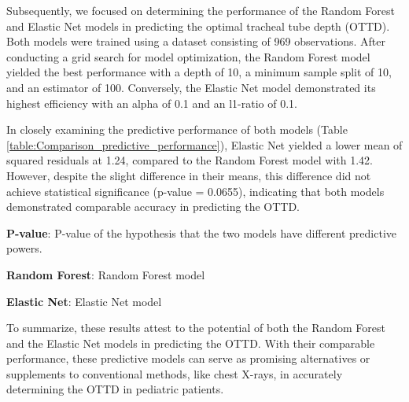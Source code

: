\documentclass[11pt]{article}
\begin{document}
Subsequently, we focused on determining the performance of the Random Forest and Elastic Net models in predicting the optimal tracheal tube depth (OTTD). Both models were trained using a dataset consisting of 969 observations. After conducting a grid search for model optimization, the Random Forest model yielded the best performance with a depth of 10, a minimum sample split of 10, and an estimator of 100. Conversely, the Elastic Net model demonstrated its highest efficiency with an alpha of 0.1 and an l1-ratio of 0.1.

In closely examining the predictive performance of both models (Table \ref{table:Comparison_predictive_performance}), Elastic Net yielded a lower mean of squared residuals at 1.24, compared to the Random Forest model with 1.42. However, despite the slight difference in their means, this difference did not achieve statistical significance (p-value = 0.0655), indicating that both models demonstrated comparable accuracy in predicting the OTTD.

\begin{table}[h]
\caption{Comparison of predictive performance of two models}
\label{table:Comparison_predictive_performance}
\begin{threeparttable}
\renewcommand{\TPTminimum}{\linewidth}
\begin{tablenotes}
\footnotesize
\item \textbf{P-value}: P-value of the hypothesis that the two models have different predictive powers.
\item \textbf{Random Forest}: Random Forest model
\item \textbf{Elastic Net}: Elastic Net model
\end{tablenotes}
\end{threeparttable}
\end{table}


To summarize, these results attest to the potential of both the Random Forest and the Elastic Net models in predicting the OTTD. With their comparable performance, these predictive models can serve as promising alternatives or supplements to conventional methods, like chest X-rays, in accurately determining the OTTD in pediatric patients.
\end{document}
